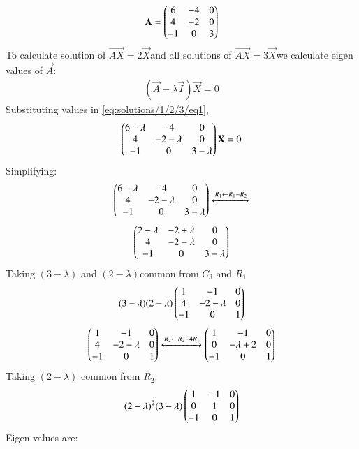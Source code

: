 %
%	
\begin{align}
\mathbf{A}=
\begin{pmatrix}6 & -4 & 0\\
4& -2 & 0\\
-1 &0 &3\end{pmatrix}
\end{align}
To calculate solution of  $\vec{AX}=2\vec{X}$and all solutions of $\vec{AX}=3\vec{X}$we calculate eigen values of $\vec{A}$:
\begin{align}\label{eq:solutions/1/2/3/eq1}
(\vec{A}-\lambda\vec{I})\vec{X}=0
\end{align}
Substituting values in \eqref{eq:solutions/1/2/3/eq1},
\begin{align}
\begin{pmatrix}6-\lambda& -4 & 0\\
4 & -2-\lambda & 0\\
-1 &0 &3-\lambda\end{pmatrix}
\mathbf{X}=0
\end{align}
Simplifying:
\begin{align}\label{eq:solutions/1/2/3/eqdet}
\begin{pmatrix}6-\lambda& -4 & 0\\
4 & -2-\lambda & 0\\
-1 &0 &3-\lambda\end{pmatrix}
\xleftrightarrow[]{R_1 \leftarrow R_1-R_2}\nonumber
\end{align}
\begin{align}
    \begin{pmatrix}2-\lambda& -2+\lambda & 0\\
4 & -2-\lambda & 0\\
-1 &0 &3-\lambda\end{pmatrix}
\end{align}
Taking $(3-\lambda)$  and $(2-\lambda)$common from $C_3$ and $R_1$
\begin{align}
(3-\lambda)(2-\lambda)
    \begin{pmatrix}1&-1&0\\
            4&-2-\lambda &0\\
            -1&0&1\end{pmatrix}
\end{align}
\begin{align}\label{eq:solutions/1/2/3/eqlambda}
\begin{pmatrix}1&-1&0\\
            4&-2-\lambda &0\\
            -1&0&1\end{pmatrix}
            \xleftrightarrow[]{R_2 \leftarrow R_2-4R_1}
    \begin{pmatrix}1&-1&0\\
            0&-\lambda +2&0\\
            -1&0&1\end{pmatrix}
\end{align}
Taking $(2-\lambda)$ common from $R_2$:
\begin{align}
(2-\lambda)^2(3-\lambda)
\begin{pmatrix}
1 &-1 &0\\
0&1&0\\
-1&0&1
\end{pmatrix}
\end{align}
Eigen values are:
